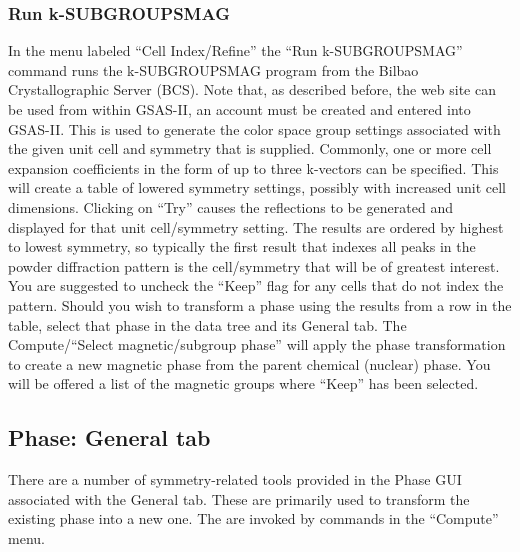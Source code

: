 \subsubsection{Run k-SUBGROUPSMAG}
In the menu labeled ``Cell Index/Refine'' the ``Run k-SUBGROUPSMAG'' command runs the k-SUBGROUPSMAG program  from the Bilbao Crystallographic Server (BCS).
Note that, as described before, the web site can be used from within GSAS-II, an account must be created and entered into GSAS-II. 
This is used to generate the color space group settings associated with the given unit cell and symmetry that is supplied. Commonly, one or more cell expansion coefficients in the form of up to three k-vectors can be specified. 
This will create a table of lowered symmetry settings, possibly with increased unit cell dimensions. Clicking on ``Try'' causes the reflections to be generated and displayed for that unit cell/symmetry setting. The results are ordered by highest to lowest symmetry, so typically the first result that indexes all peaks in the powder diffraction pattern is the cell/symmetry that will be of greatest interest. 
You are suggested to uncheck the ``Keep'' flag for any cells that do not index the pattern.  
Should you wish to transform a phase using the results from a row in the table, select that phase in the data tree and its General tab. The Compute/``Select magnetic/subgroup phase'' will apply the phase transformation to create a new magnetic phase from the parent chemical (nuclear) phase. You will be offered a list of the magnetic groups where ``Keep'' has been selected. 

\subsection{Phase: General tab}
There are a number of symmetry-related tools provided in the Phase GUI associated with the General tab. These are primarily used to transform the existing phase into a new one. The are invoked by commands in the ``Compute'' menu. 


